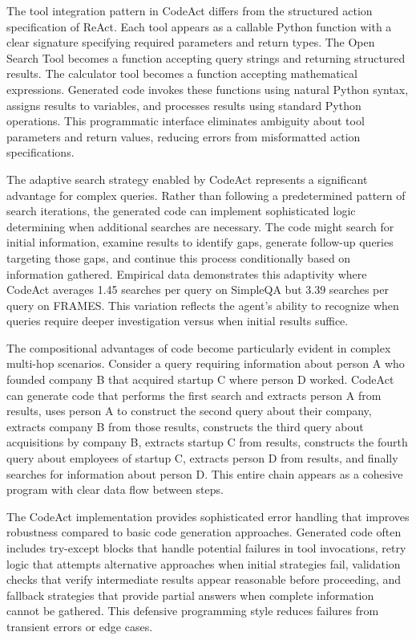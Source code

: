 The tool integration pattern in CodeAct differs from the structured action specification of ReAct. Each tool appears as a callable Python function with a clear signature specifying required parameters and return types. The Open Search Tool becomes a function accepting query strings and returning structured results. The calculator tool becomes a function accepting mathematical expressions. Generated code invokes these functions using natural Python syntax, assigns results to variables, and processes results using standard Python operations. This programmatic interface eliminates ambiguity about tool parameters and return values, reducing errors from misformatted action specifications.

The adaptive search strategy enabled by CodeAct represents a significant advantage for complex queries. Rather than following a predetermined pattern of search iterations, the generated code can implement sophisticated logic determining when additional searches are necessary. The code might search for initial information, examine results to identify gaps, generate follow-up queries targeting those gaps, and continue this process conditionally based on information gathered. Empirical data demonstrates this adaptivity where CodeAct averages 1.45 searches per query on SimpleQA but 3.39 searches per query on FRAMES. This variation reflects the agent's ability to recognize when queries require deeper investigation versus when initial results suffice.

The compositional advantages of code become particularly evident in complex multi-hop scenarios. Consider a query requiring information about person A who founded company B that acquired startup C where person D worked. CodeAct can generate code that performs the first search and extracts person A from results, uses person A to construct the second query about their company, extracts company B from those results, constructs the third query about acquisitions by company B, extracts startup C from results, constructs the fourth query about employees of startup C, extracts person D from results, and finally searches for information about person D. This entire chain appears as a cohesive program with clear data flow between steps.

The CodeAct implementation provides sophisticated error handling that improves robustness compared to basic code generation approaches. Generated code often includes try-except blocks that handle potential failures in tool invocations, retry logic that attempts alternative approaches when initial strategies fail, validation checks that verify intermediate results appear reasonable before proceeding, and fallback strategies that provide partial answers when complete information cannot be gathered. This defensive programming style reduces failures from transient errors or edge cases.

